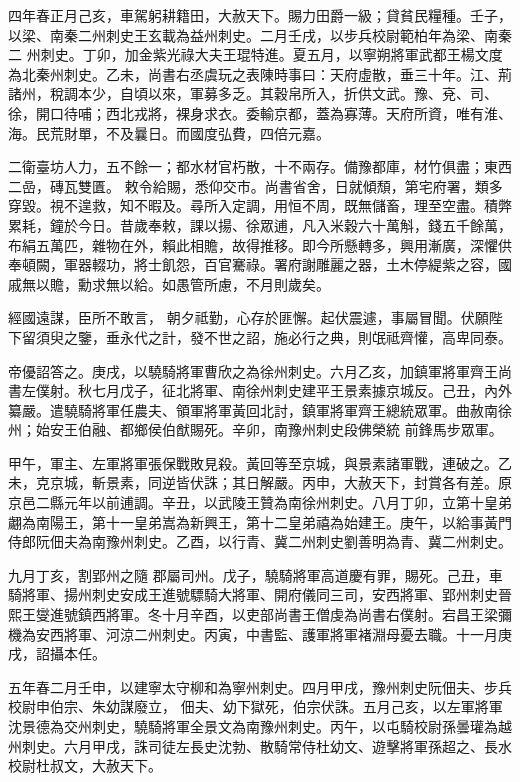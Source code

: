 \begin{pinyinscope}
 四年春正月己亥，車駕躬耕籍田，大赦天下。賜力田爵一級；貸貧民糧種。壬子，以梁、南秦二州刺史王玄載為益州刺史。二月壬戌，以步兵校尉範柏年為梁、南秦二
 州刺史。丁卯，加金紫光祿大夫王琨特進。夏五月，以寧朔將軍武都王楊文度為北秦州刺史。乙未，尚書右丞虞玩之表陳時事曰：天府虛散，垂三十年。江、荊諸州，稅調本少，自頃以來，軍募多乏。其穀帛所入，折供文武。豫、兗、司、徐，開口待哺；西北戎將，裸身求衣。委輸京都，蓋為寡薄。天府所資，唯有淮、海。民荒財單，不及曩日。而國度弘費，四倍元嘉。



 二衛臺坊人力，五不餘一；都水材官朽散，十不兩存。備豫都庫，材竹俱盡；東西二嵒，磚瓦雙匱。
 敕令給賜，悉仰交市。尚書省舍，日就傾頹，第宅府署，類多穿毀。視不遑救，知不暇及。尋所入定調，用恒不周，既無儲畜，理至空盡。積弊累耗，鐘於今日。昔歲奉敕，課以揚、徐眾逋，凡入米穀六十萬斛，錢五千餘萬，布絹五萬匹，雜物在外，賴此相贍，故得推移。即今所懸轉多，興用漸廣，深懼供奉頓闕，軍器輟功，將士飢怨，百官騫祿。署府謝雕麗之器，土木停緹紫之容，國戚無以贍，勳求無以給。如愚管所慮，不月則歲矣。



 經國遠謀，臣所不敢言，
 朝夕祗勤，心存於匪懈。起伏震遽，事屬冒聞。伏願陛下留須臾之鑒，垂永代之計，發不世之詔，施必行之典，則氓祗齊懽，高卑同泰。



 帝優詔答之。庚戌，以驍騎將軍曹欣之為徐州刺史。六月乙亥，加鎮軍將軍齊王尚書左僕射。秋七月戊子，征北將軍、南徐州刺史建平王景素據京城反。己丑，內外纂嚴。遣驍騎將軍任農夫、領軍將軍黃回北討，鎮軍將軍齊王總統眾軍。曲赦南徐州；始安王伯融、都鄉侯伯猷賜死。辛卯，南豫州刺史段佛榮統
 前鋒馬步眾軍。



 甲午，軍主、左軍將軍張保戰敗見殺。黃回等至京城，與景素諸軍戰，連破之。乙未，克京城，斬景素，同逆皆伏誅；其日解嚴。丙申，大赦天下，封賞各有差。原京邑二縣元年以前逋調。辛丑，以武陵王贊為南徐州刺史。八月丁卯，立第十皇弟翽為南陽王，第十一皇弟嵩為新興王，第十二皇弟禧為始建王。庚午，以給事黃門侍郎阮佃夫為南豫州刺史。乙酉，以行青、冀二州刺史劉善明為青、冀二州刺史。



 九月丁亥，割郢州之隨
 郡屬司州。戊子，驍騎將軍高道慶有罪，賜死。己丑，車騎將軍、揚州刺史安成王進號驃騎大將軍、開府儀同三司，安西將軍、郢州刺史晉熙王燮進號鎮西將軍。冬十月辛酉，以吏部尚書王僧虔為尚書右僕射。宕昌王梁彌機為安西將軍、河涼二州刺史。丙寅，中書監、護軍將軍褚淵母憂去職。十一月庚戌，詔攝本任。



 五年春二月壬申，以建寧太守柳和為寧州刺史。四月甲戌，豫州刺史阮佃夫、步兵校尉申伯宗、朱幼謀廢立，
 佃夫、幼下獄死，伯宗伏誅。五月己亥，以左軍將軍沈景德為交州刺史，驍騎將軍全景文為南豫州刺史。丙午，以屯騎校尉孫曇瓘為越州刺史。六月甲戌，誅司徒左長史沈勃、散騎常侍杜幼文、遊擊將軍孫超之、長水校尉杜叔文，大赦天下。




\end{pinyinscope}
